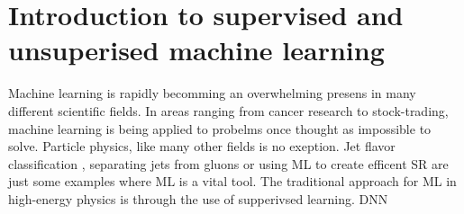 \chapter{Introduction to supervised and unsuperised machine learning}\label{chap:Intro ML}
Machine learning is rapidly becomming an overwhelming presens in many different scientific fields.
In areas ranging from cancer research to stock-trading, machine learning is being applied to probelms
once thought as impossible to solve. Particle physics, like many other fields is no exeption. Jet flavor classification \cite{Guest_2016}, 
separating jets from gluons \cite{PhysRevD.44.2025} or using \ac{ML} to create efficent \ac{SR} are just some examples
where \ac{ML} is a vital tool. The traditional approach for ML in high-energy physics is through the use 
of supperivsed learning. \ac{DNN}

